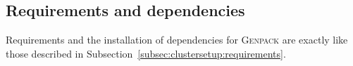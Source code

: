 
\subsection{Requirements and dependencies}
\label{subsec:genpacksetup:requirements}

Requirements and the installation of dependencies for \textsc{Genpack} are exactly like those described in Subsection~\ref{subsec:clustersetup:requirements}.

